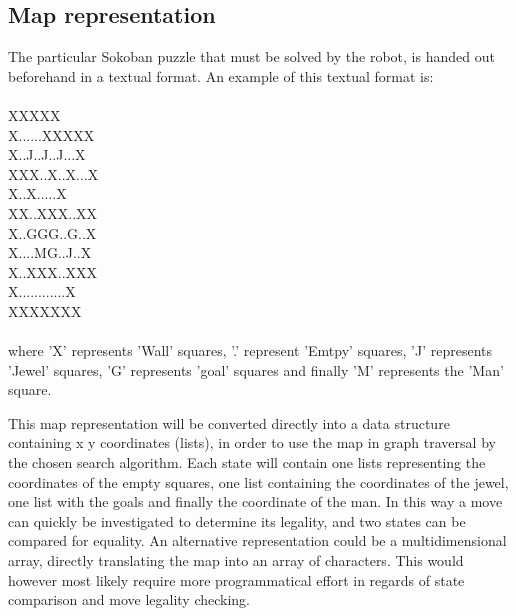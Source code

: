 \subsection{Map representation}
The particular Sokoban puzzle that must be solved by the robot, is handed out beforehand in a textual format. An example of this textual format is:
\\\\
XXXXX\\  
X......XXXXX\\ 
X..J..J..J...X\\  
XXX..X..X...X\\   
\hspace*{6 mm}X..X.....X\\  
\hspace*{3 mm}XX..XXX..XX\\        
\hspace*{3 mm}X..GGG..G..X\\ 
\hspace*{3 mm}X....MG..J..X\\  
\hspace*{3 mm}X..XXX..XXX\\     
\hspace*{3 mm}X............X\\
\hspace*{3 mm}XXXXXXX  
\\\\ 
where 'X' represents 'Wall' squares, '.' represent 'Emtpy' squares, 'J' represents 'Jewel' squares, 'G' represents 'goal' squares and finally 'M' represents the 'Man' square. 

This map representation will be converted directly into a data structure containing x y coordinates (lists), in order to use the map in graph traversal by the chosen search algorithm. Each state will contain one lists representing the coordinates of the empty squares, one list containing the coordinates of the jewel, one list with the goals and finally the coordinate of the man. In this way a move can quickly be investigated to determine its legality, and two states can be compared for equality.
An alternative representation could be a multidimensional array, directly translating the map into an array of characters. This would however most likely require more programmatical effort in regards of state comparison and move legality checking.